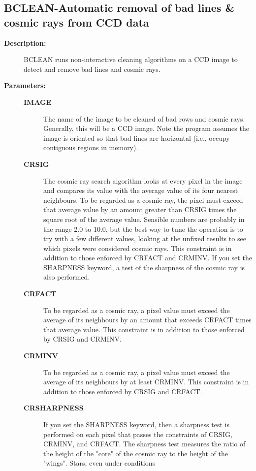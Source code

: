 \subsection{BCLEAN-\label{BCLEAN}Automatic removal of bad lines & cosmic rays from CCD data}
\begin{description}

\item [{\bf Description:}]
 BCLEAN runs non-interactive cleaning algorithms on a CCD image
 to detect and remove bad lines and cosmic rays.

\item [{\bf Parameters:}]
\begin{description}
\item [{\bf IMAGE}]
 The name of the image to be cleaned of bad rows and cosmic rays.
 Generally, this will be a CCD image.  Note the program assumes
 the image is oriented so that bad lines are horizontal (i.e.,
 occupy contiguous regions in memory).
\item [{\bf CRSIG}]
 The cosmic ray search algorithm looks at every pixel in the image
 and compares its value with the average value of its four nearest
 neighbours.  To be regarded as a cosmic ray, the pixel must exceed
 that average value by an amount greater than CRSIG times the square
 root of the average value.  Sensible numbers are probably in the
 range 2.0 to 10.0, but the best way to tune the operation is to try
 with a few different values, looking at the unfixed results to see
 which pixels were considered cosmic rays.  This constraint is in
 addition to those enforced by CRFACT and CRMINV.  If you set the
 SHARPNESS keyword, a test of the sharpness of the cosmic ray is
 also performed.
\item [{\bf CRFACT}]
 To be regarded as a cosmic ray, a pixel value must exceed
 the average of its neighbours by an amount that exceeds
 CRFACT times that average value.  This constraint is in
 addition to those enforced by CRSIG and CRMINV.
\item [{\bf CRMINV}]
 To be regarded as a cosmic ray, a pixel value must exceed
 the average of its neighbours by at least CRMINV.  This
 constraint is in addition to those enforced by CRSIG and
 CRFACT.
\item [{\bf CRSHARPNESS}]
 If you set the SHARPNESS keyword, then a sharpness
 test is performed on each pixel that passes the constraints
 of CRSIG, CRMINV, and CRFACT. The sharpness test measures
 the ratio of the height of the "core" of the cosmic ray
 to the height of the "wings". Stars, even under conditions

\end{description}
\end{description}

